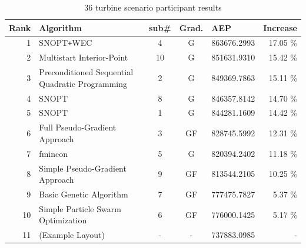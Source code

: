 \begin{table}[htbp]
			\begin{center}
				\caption{36 turbine scenario participant results}
				\label{tab:results2}
				\begin{tabular}{r l c c l r}
					\hline
					Rank	& Algorithm											& sub\#	& Grad.	& AEP			& Increase		\\	%
					\hline
					1		& SNOPT\texttt{+}WEC								& 4		& G		& 863676.2993   &	17.05 \% 	\\ %
					2		& Multistart Interior-Point							& 10	& G		& 851631.9310	&	15.42 \% 	\\ %
					3		& Preconditioned Sequential Quadratic Programming	& 2     & G		& 849369.7863	&	15.11 \% 	\\ %
					4		& SNOPT												& 8     & G		& 846357.8142	&	14.70 \% 	\\ %
					5		& SNOPT												& 1     & G		& 844281.1609	&	14.42 \% 	\\ %
					6		& Full Pseudo-Gradient Approach						& 3     & GF	& 828745.5992	&	12.31 \% 	\\ %
					7		& fmincon											& 5     & G		& 820394.2402	&	11.18 \% 	\\ %
					8		& Simple Pseudo-Gradient Approach					& 9     & GF	& 813544.2105	&	10.25 \% 	\\ %
					9		& Basic Genetic Algorithm							& 7     & GF	& 777475.7827	&	5.37 \% 	\\ %
					10		& Simple Particle Swarm Optimization				& 6     & GF	& 776000.1425	&	5.17 \% 	\\ %
					11		& (Example Layout)									& -		& -		& 737883.0985	&	- 			\\ %
					\hline
				\end{tabular}
			\end{center}


\end{table}
